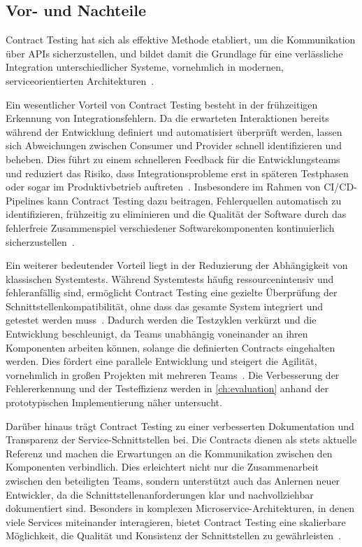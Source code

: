 \subsection{Vor- und Nachteile}\label{subsec:foundation_contracttesting_proscons}

Contract Testing hat sich als effektive Methode etabliert, um die Kommunikation über \glspl{API} sicherzustellen, und bildet damit die Grundlage für eine verlässliche Integration unterschiedlicher Systeme, vornehmlich in modernen, serviceorientierten Architekturen~\cite{newmanBuildingMicroservices2021}.

Ein wesentlicher Vorteil von Contract Testing besteht in der frühzeitigen Erkennung von Integrationsfehlern.
Da die erwarteten Interaktionen bereits während der Entwicklung definiert und automatisiert überprüft werden, lassen sich Abweichungen zwischen Consumer und Provider schnell identifizieren und beheben.
Dies führt zu einem schnelleren Feedback für die Entwicklungsteams und reduziert das Risiko, dass Integrationsprobleme erst in späteren Testphasen oder sogar im Produktivbetrieb auftreten~\cite{cruzContractTestingAction2025}.
Insbesondere im Rahmen von \gls{CI}/\gls{CD}-\glspl{Pipeline} kann Contract Testing dazu beitragen, Fehlerquellen automatisch zu identifizieren, frühzeitig zu eliminieren und die Qualität der Software durch das fehlerfreie Zusammenspiel verschiedener Softwarekomponenten kontinuierlich sicherzustellen~\cite{duvallContinuousIntegrationImproving2007}.

Ein weiterer bedeutender Vorteil liegt in der Reduzierung der Abhängigkeit von klassischen Systemtests.
Während Systemtests häufig ressourcenintensiv und fehleranfällig sind, ermöglicht Contract Testing eine gezielte Überprüfung der Schnittstellenkompatibilität, ohne dass das gesamte System integriert und getestet werden muss~\cite{clemsonTestingStrategiesMicroservice2014}.
Dadurch werden die Testzyklen verkürzt und die Entwicklung beschleunigt, da Teams unabhängig voneinander an ihren Komponenten arbeiten können, solange die definierten Contracts eingehalten werden.
Dies fördert eine parallele Entwicklung und steigert die Agilität, vornehmlich in großen Projekten mit mehreren Teams~\cite{cruzContractTestingAction2025}.
Die Verbesserung der Fehlererkennung und der Testeffizienz werden in \cref{ch:evaluation} anhand der prototypischen Implementierung näher untersucht.

Darüber hinaus trägt Contract Testing zu einer verbesserten Dokumentation und Transparenz der Service-Schnittstellen bei.
Die Contracts dienen als stets aktuelle Referenz und machen die Erwartungen an die Kommunikation zwischen den Komponenten verbindlich.
Dies erleichtert nicht nur die Zusammenarbeit zwischen den beteiligten Teams, sondern unterstützt auch das Anlernen neuer Entwickler, da die Schnittstellenanforderungen klar und nachvollziehbar dokumentiert sind.
Besonders in komplexen Microservice-Architekturen, in denen viele Services miteinander interagieren, bietet Contract Testing eine skalierbare Möglichkeit, die Qualität und Konsistenz der Schnittstellen zu gewährleisten~\cite{richardsonMicroservicesPatterns2018}.

